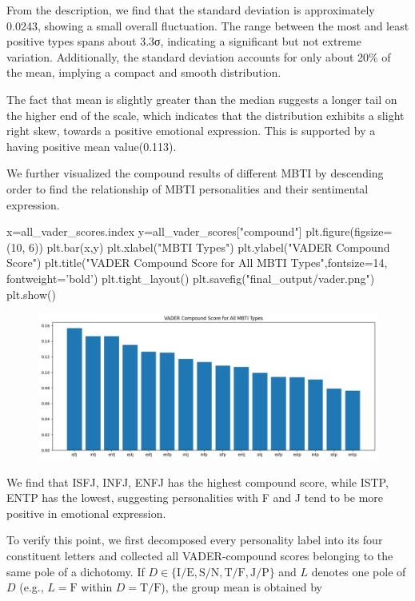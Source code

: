 \documentclass[12pt]{article}
\numberwithin{figure}{section}  %
\begin{document}
	From the description, we find that the standard deviation is approximately
	0.0243, showing a small overall fluctuation. The range between the most and
	least positive types spans about 3.3σ, indicating a significant but not
	extreme variation. Additionally, the standard deviation accounts for only
	about 20\% of the mean, implying a compact and smooth distribution.
	
	The fact that mean is slightly greater than the median suggests a longer
	tail on the higher end of the scale, which indicates that the distribution
	exhibits a slight right skew, towards a positive emotional expression. This
	is supported by a having positive mean value(0.113).
	
	We further visualized the compound results of different MBTI by descending
	order to find the relationship of MBTI personalities and their sentimental
	expression.
	
	\begin{python}
x=all_vader_scores.index
y=all_vader_scores["compound"]
plt.figure(figsize=(10, 6))
plt.bar(x,y)
plt.xlabel("MBTI Types")
plt.ylabel("VADER Compound Score")
plt.title("VADER Compound Score for All MBTI Types",fontsize=14, fontweight='bold')
plt.tight_layout()
plt.savefig("final_output/vader.png")
plt.show()
	\end{python}
	\begin{figure}[H]
			\centering
			\includegraphics[width=1\textwidth]{Q2VADERa1} 
			\caption{\centering }		
	\end{figure}
	
	We find that ISFJ, INFJ, ENFJ has the highest compound score, while ISTP,
	ENTP has the lowest, suggesting personalities with F and J tend to be more
	positive in emotional expression.
	
	To verify this point, we first decomposed every personality label into its
	four constituent letters and collected all VADER-compound scores belonging
	to the same pole of a dichotomy.  If
	$D\in\{\text{I/E},\text{S/N},\text{T/F},\text{J/P}\}$ and $L$ denotes one
	pole of $D$ (e.g., $L=\text{F}$ within $D=\text{T/F}$), the group mean is
	obtained by
	
\end{document}
